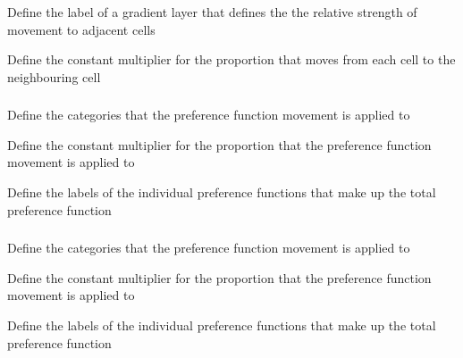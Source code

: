  {Define the label of a gradient layer that defines the the relative strength of movement to adjacent cells}

 {Define the constant multiplier for the proportion that moves from each cell to the neighbouring cell}

\subsubsection[Preference movement]{}

 {Define the categories that the preference function movement is applied to}

 {Define the constant multiplier for the proportion that the preference function movement is applied to}

 {Define the labels of the individual  preference functions that make up the total preference function}

\subsubsection[Multi-threaded preference movement]{}

 {Define the categories that the preference function movement is applied to}

 {Define the constant multiplier for the proportion that the preference function movement is applied to}

 {Define the labels of the individual  preference functions that make up the total preference function}

